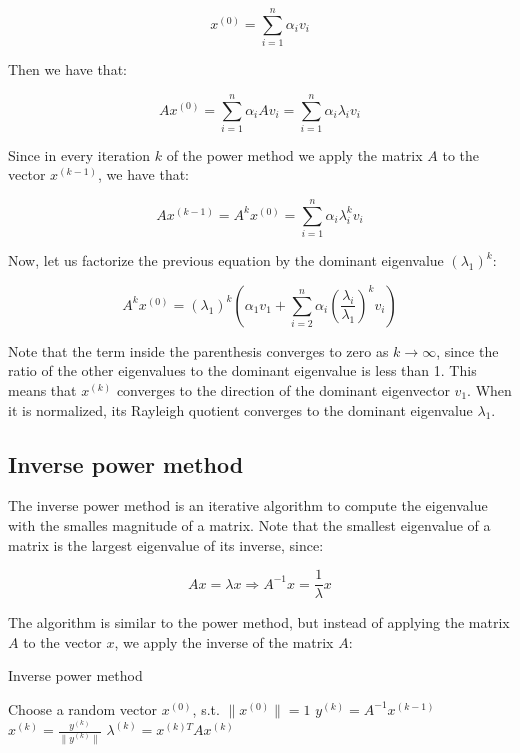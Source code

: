 \begin{equation}
    x^{(0)} = \sum_{i=1}^{n} \alpha_i v_i
\end{equation}

Then we have that:

\begin{equation}
    A x^{(0)} = \sum_{i=1}^{n} \alpha_i A v_i = \sum_{i=1}^{n} \alpha_i \lambda_i v_i
\end{equation}

Since in every iteration $k$ of the power method we apply the matrix $A$ to the vector $x^{(k-1)}$, we have that:

\begin{equation}
    A x^{(k-1)} = A^k x^{(0)} = \sum_{i=1}^{n} \alpha_i \lambda_i^k v_i
\end{equation}

Now, let us factorize the previous equation by the dominant eigenvalue $(\lambda_1)^k$:

\begin{equation}
    A^k x^{(0)} = (\lambda_1)^k \left( \alpha_1 v_1 + \sum_{i=2}^{n} \alpha_i \left( \frac{\lambda_i}{\lambda_1} \right)^k v_i\right)
\end{equation}

Note that the term inside the parenthesis converges to zero as $k \rightarrow \infty$, since the ratio of the other eigenvalues
to the dominant eigenvalue is less than 1. This means that $x^(k)$ converges to the direction of the dominant eigenvector $v_1$.
When it is normalized, its Rayleigh quotient converges to the dominant eigenvalue $\lambda_1$.

\subsection{Inverse power method}

The inverse power method is an iterative algorithm to compute the eigenvalue with the smalles magnitude of a matrix. Note that the smallest
eigenvalue of a matrix is the largest eigenvalue of its inverse, since:

\begin{equation}
    A x = \lambda x \Rightarrow A^{-1} x = \frac{1}{\lambda} x
\end{equation}

The algorithm is similar to the power method, but instead of applying the matrix $A$ to the vector $x$, we apply the inverse
of the matrix $A$:

\begin{algorithm}[H]
    \caption{Inverse power method}
    \begin{algorithmic}[1]
        \State Choose a random vector $x^{(0)}$, s.t. $\|x^{(0)}\| = 1$
            \State $y^{(k)} = A^{-1} x^{(k-1)}$
            \State $x^{(k)} = \frac{y^{(k)}}{\|y^{(k)}\|}$
            \State $\lambda^{(k)} = x^{(k)T} A x^{(k)}$
        \EndFor
    \end{algorithmic}
\end{algorithm}

